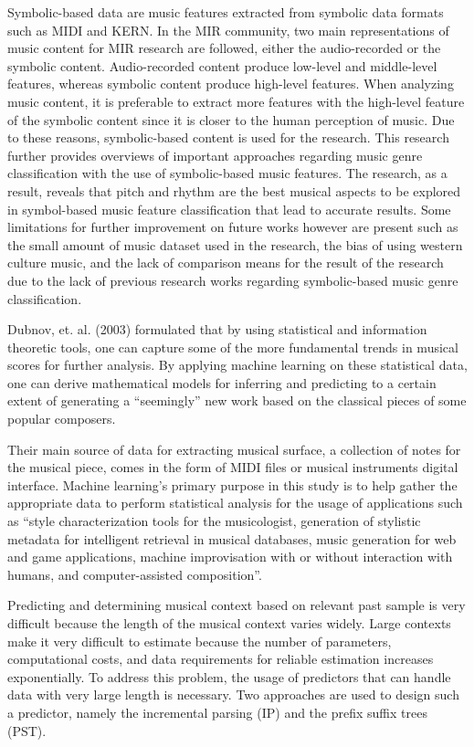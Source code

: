 Symbolic-based data are music features extracted from symbolic data formats such as MIDI and KERN. In the MIR community, two main representations of music content for MIR research are followed, either the audio-recorded or the symbolic content. Audio-recorded content produce low-level and middle-level features, whereas symbolic content produce high-level features. When analyzing music content, it is preferable to extract more features with the high-level feature of the symbolic content since it is closer to the human perception of music. Due to these reasons, symbolic-based content is used for the research. This research further provides overviews of important approaches regarding music genre classification with the use of symbolic-based music features. The research, as a result, reveals that pitch and rhythm are the best musical aspects to be explored in symbol-based music feature classification that lead to accurate results.  Some limitations for further improvement on future works however are present such as the small amount of music dataset used in the research, the bias of using western culture music, and the lack of comparison means for the result of the research due to the lack of previous research works regarding symbolic-based music genre classification.

Dubnov, et. al. (2003) formulated that by using statistical and information theoretic tools, one can capture some of the more fundamental trends in musical scores for further analysis. By applying machine learning on these statistical data, one can derive mathematical models for inferring and predicting to a certain extent of generating a “seemingly” new work based on the classical pieces of some popular composers.

Their main source of data for extracting musical surface, a collection of notes for the musical piece, comes in the form of MIDI files or musical instruments digital interface. Machine learning’s primary purpose in this study is to help gather the appropriate data to perform statistical analysis for the usage of applications such as “style characterization tools for the musicologist, generation of stylistic metadata for intelligent retrieval in musical databases, music generation for web and game applications, machine improvisation with or without interaction with humans, and computer-assisted composition”.

Predicting and determining musical context based on relevant past sample is very difficult because the length of the musical context varies widely. Large contexts make it very difficult to estimate because the number of parameters, computational costs, and data requirements for reliable estimation increases exponentially. To address this problem, the usage of predictors that can handle data with very large length is necessary. Two approaches are used to design such a predictor, namely the incremental parsing (IP) and the prefix suffix trees (PST).

